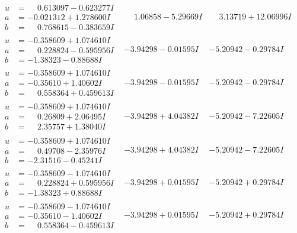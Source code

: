 \documentclass[1p]{elsarticle_modified}
\theoremstyle{definition}
\begin{document}
$$\begin{array}{c|c|c}
\begin{aligned}
u &= \phantom{-}0.613097 - 0.623277 I \\
a &= -0.021312 + 1.278600 I \\
b &= \phantom{-}0.768615 - 0.383659 I\end{aligned}
 & \phantom{-}1.06858 - 5.29669 I & \phantom{-}3.13719 + 12.06996 I \\ \hline\begin{aligned}
u &= -0.358609 + 1.074610 I \\
a &= \phantom{-}0.228824 - 0.595956 I \\
b &= -1.38323 - 0.88688 I\end{aligned}
 & -3.94298 - 0.01595 I & -5.20942 - 0.29784 I \\ \hline\begin{aligned}
u &= -0.358609 + 1.074610 I \\
a &= -0.35610 + 1.40602 I \\
b &= \phantom{-}0.558364 + 0.459613 I\end{aligned}
 & -3.94298 - 0.01595 I & -5.20942 - 0.29784 I \\ \hline\begin{aligned}
u &= -0.358609 + 1.074610 I \\
a &= \phantom{-}0.26809 + 2.06495 I \\
b &= \phantom{-}2.35757 + 1.38040 I\end{aligned}
 & -3.94298 + 4.04382 I & -5.20942 - 7.22605 I \\ \hline\begin{aligned}
u &= -0.358609 + 1.074610 I \\
a &= \phantom{-}0.49708 - 2.35976 I \\
b &= -2.31516 - 0.45241 I\end{aligned}
 & -3.94298 + 4.04382 I & -5.20942 - 7.22605 I \\ \hline\begin{aligned}
u &= -0.358609 - 1.074610 I \\
a &= \phantom{-}0.228824 + 0.595956 I \\
b &= -1.38323 + 0.88688 I\end{aligned}
 & -3.94298 + 0.01595 I & -5.20942 + 0.29784 I \\ \hline\begin{aligned}
u &= -0.358609 - 1.074610 I \\
a &= -0.35610 - 1.40602 I \\
b &= \phantom{-}0.558364 - 0.459613 I\end{aligned}
 & -3.94298 + 0.01595 I & -5.20942 + 0.29784 I \\ \hline\begin{aligned}

\end{aligned}
\end{array}$$
\end{document}
